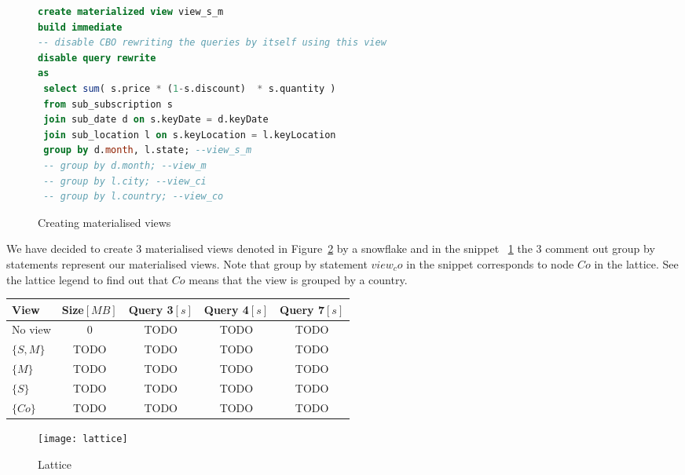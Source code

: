 \begin{figure}[!hbp]
\begin{lstlisting}[language=sql] 
create materialized view view_s_m 
build immediate  
-- disable CBO rewriting the queries by itself using this view
disable query rewrite 
as 
 select sum( s.price * (1-s.discount)  * s.quantity )  
 from sub_subscription s
 join sub_date d on s.keyDate = d.keyDate
 join sub_location l on s.keyLocation = l.keyLocation
 group by d.month, l.state; --view_s_m
 -- group by d.month; --view_m
 -- group by l.city; --view_ci
 -- group by l.country; --view_co

\end{lstlisting}
\caption{\label{s:views}  Creating materialised views}
\end{figure}

We have decided to create 3 materialised views denoted in Figure~\ref{fig:lattice}
by a snowflake and in the snippet ~\ref{s:views} the 3 comment out group by statements represent 
our materialised views. Note that group by statement  $view_co$ in the snippet 
corresponds to node ${Co}$ in the lattice. See the lattice legend to find out that ${Co}$ means that
the view is grouped by a country.

\begin{tabular}{|l|c|c|c|c|}
\hline
View & Size$[MB]$& Query 3$[s]$ & Query 4$[s]$ & Query 7$[s]$\\
\hline
\hline
No view & 0 & TODO & TODO & TODO\\
$\{S,M\}$ & TODO & TODO & TODO & TODO\\
$\{M\}$ & TODO & TODO & TODO & TODO\\
$\{S\}$ & TODO & TODO & TODO & TODO\\
$\{Co\}$ & TODO & TODO & TODO & TODO\\
\hline
\end{tabular}


\begin{figure}[!hbp]
\begin{center}
  \texttt{[image: lattice]}
\caption{\label{fig:lattice}  Lattice}
\end{center}
\end{figure}


